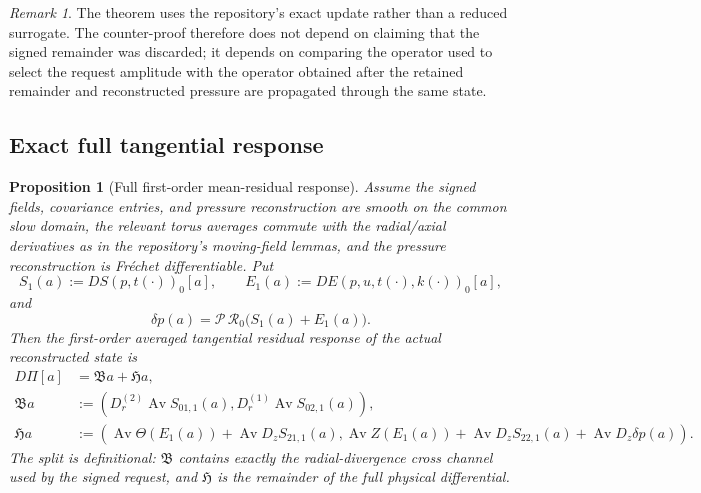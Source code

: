 \documentclass[12pt]{article}
\theoremstyle{plain}
\newtheorem{proposition}[theorem]{Proposition}
\theoremstyle{definition}
\theoremstyle{remark}
\newtheorem{remark}[theorem]{Remark}
\newcommand{\mean}{\operatorname{Av}}
\newcommand{\Red}{\mathfrak B}
\newcommand{\Hidden}{\mathfrak H}
\newcommand{\Obs}{\Pi}
\begin{document}
\begin{remark}
The theorem uses the repository's exact update rather than a reduced surrogate. The counter-proof therefore does not depend on claiming that the signed remainder was discarded; it depends on comparing the operator used to select the request amplitude with the operator obtained after the retained remainder and reconstructed pressure are propagated through the same state.
\end{remark}

\subsection{Exact full tangential response}
\begin{proposition}[Full first-order mean-residual response]\label{prop:fullresponse}
Assume the signed fields, covariance entries, and pressure reconstruction are smooth on the common slow domain, the relevant torus averages commute with the radial/axial derivatives as in the repository's moving-field lemmas, and the pressure reconstruction is Fr\'echet differentiable. Put
\[
S_1(a):=DS(p,t(\cdot))_{0}[a],
\qquad
E_1(a):=DE(p,u,t(\cdot),k(\cdot))_{0}[a],
\]
and
\[
\delta p(a)=\mathscr P\,\mathcal R_0\bigl(S_1(a)+E_1(a)\bigr).
\]
Then the first-order averaged tangential residual response of the actual reconstructed state is
\begin{align}
D\Obs[a]&=\Red a+\Hidden a,\label{eq:A=B+H}\\
\Red a&:=\left(
D_r^{(2)}\mean S_{01,1}(a),
D_r^{(1)}\mean S_{02,1}(a)
\right),\label{eq:Bdef}\\
\Hidden a&:=\left(
\mean\Theta(E_1(a))+\mean D_zS_{21,1}(a),
\mean Z(E_1(a))+\mean D_zS_{22,1}(a)+\mean D_z\delta p(a)
\right).
\label{eq:Hdef}
\end{align}
The split is definitional: \(\Red\) contains exactly the radial-divergence cross channel used by the signed request, and \(\Hidden\) is the remainder of the full physical differential.
\end{proposition}
\end{document}
